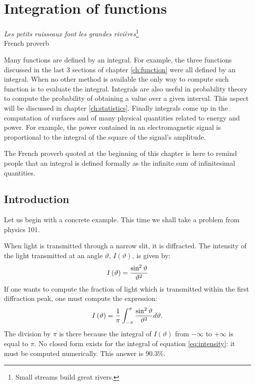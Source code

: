 \documentclass[twoside]{book}
\begin{document}
\fi

\chapter{Integration of functions}
\label{ch:integration}
\begin{flushright}
{\sl Les petits ruisseaux font les grandes
rivi\`{e}res}\footnote{Small streams build great rivers.}\\ French
proverb
\end{flushright}
\vspace{1 ex}Many functions are defined by an integral. For
example, the three functions discussed in the last 3 sections of
chapter \ref{ch:function} were all defined by an integral. When no
other method is available the only way to compute such function is
to evaluate the integral. Integrals are also useful in probability
theory to compute the probability of obtaining a value over a
given interval. This aspect will be discussed in chapter
\ref{ch:statistics}. Finally integrals come up in the computation
of surfaces and of many physical quantities related to energy and
power. For example, the power contained in an electromagnetic
signal is proportional to the integral of the square of the
signal's amplitude.

The French proverb quoted at the beginning of this chapter is here
to remind people that an integral is defined formally as the
infinite sum of infinitesimal quantities.

\section{Introduction}
Let us begin with a concrete example. This time we shall take a
problem from physics 101.

When light is transmitted through a narrow slit, it is diffracted.
The intensity of the light transmitted at an angle $\vartheta$,
$I\left(\vartheta\right)$, is given by:
\begin{equation}
  I\left(\vartheta\right)={\sin^2\vartheta \over \vartheta^2}
\end{equation}
If one wants to compute the fraction of light which is transmitted
within the first diffraction peak, one must compute the
expression:
\begin{equation}
\label{eq:intensity}
  I\left(\vartheta\right)={1 \over\pi}\int_{-\pi}^{\pi}{\sin^2\vartheta \over
  \vartheta^2}d\vartheta.
\end{equation}
The division by $\pi$ is there because the integral of
$I\left(\vartheta\right)$ from $-\infty$ to $+\infty$ is equal to
$\pi$. No closed form exists for the integral of equation
\ref{eq:intensity}: it must be computed numerically. This answer
is $90.3\%$.
\end{document}
